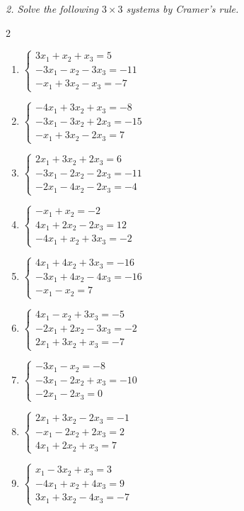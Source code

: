 \emph{2. Solve the following $3\times 3$ systems by Cramer’s rule.}
\bigskip
\begin{multicols}{2}\raggedright
\begin{enumerate}[label=\arabic*., leftmargin=*]
\item $\begin{cases}3x_1+x_2+x_3=5\\-3x_1-x_2-3x_3=-11\\-x_1+3x_2-x_3=-7\end{cases}$
\item $\begin{cases}-4x_1+3x_2+x_3=-8\\-3x_1-3x_2+2x_3=-15\\-x_1+3x_2-2x_3=7\end{cases}$
\item $\begin{cases}2x_1+3x_2+2x_3=6\\-3x_1-2x_2-2x_3=-11\\-2x_1-4x_2-2x_3=-4\end{cases}$
\item $\begin{cases}-x_1+x_2=-2\\4x_1+2x_2-2x_3=12\\-4x_1+x_2+3x_3=-2\end{cases}$
\item $\begin{cases}4x_1+4x_2+3x_3=-16\\-3x_1+4x_2-4x_3=-16\\-x_1-x_2=7\end{cases}$
\item $\begin{cases}4x_1-x_2+3x_3=-5\\-2x_1+2x_2-3x_3=-2\\2x_1+3x_2+x_3=-7\end{cases}$
\item $\begin{cases}-3x_1-x_2=-8\\-3x_1-2x_2+x_3=-10\\-2x_1-2x_3=0\end{cases}$
\item $\begin{cases}2x_1+3x_2-2x_3=-1\\-x_1-2x_2+2x_3=2\\4x_1+2x_2+x_3=7\end{cases}$
\item $\begin{cases}x_1-3x_2+x_3=3\\-4x_1+x_2+4x_3=9\\3x_1+3x_2-4x_3=-7\end{cases}$

\end{enumerate}
\end{multicols}
